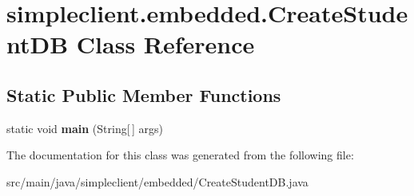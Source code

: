 \hypertarget{classsimpleclient_1_1embedded_1_1CreateStudentDB}{}\section{simpleclient.\+embedded.\+Create\+Student\+DB Class Reference}
\label{classsimpleclient_1_1embedded_1_1CreateStudentDB}
\subsection*{Static Public Member Functions}
\begin{DoxyCompactItemize}
\item 
\mbox{\label{classsimpleclient_1_1embedded_1_1CreateStudentDB_a2e035d79bb64d525e3c00c4eba4b89fe}} 
static void {\bfseries main} (String\mbox{[}$\,$\mbox{]} args)
\end{DoxyCompactItemize}


The documentation for this class was generated from the following file\+:\begin{DoxyCompactItemize}
\item 
src/main/java/simpleclient/embedded/Create\+Student\+D\+B.\+java\end{DoxyCompactItemize}
